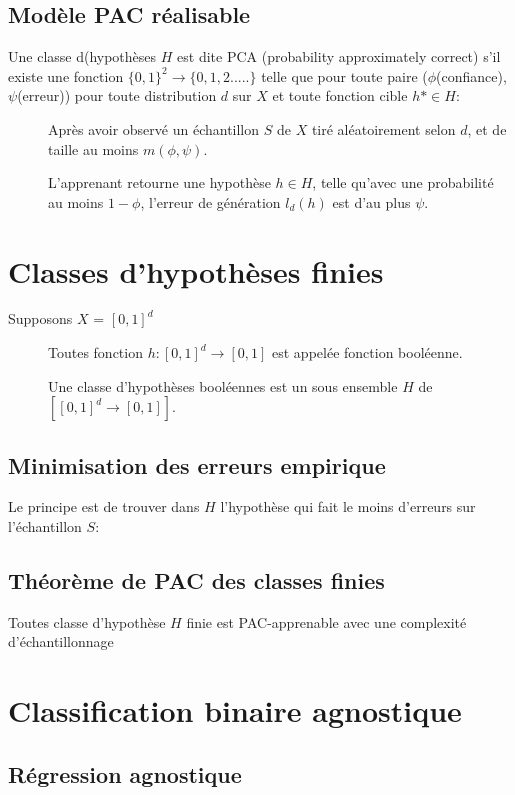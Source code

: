 \subsection{Modèle PAC réalisable}
Une classe d(hypothèses $H$ est dite PCA (probability approximately correct) s'il existe une fonction $\{0,1\}^2 \rightarrow \{0,1,2.....\}$ telle que pour toute paire ($\phi$(confiance),$\psi$(erreur)) pour toute distribution $d$ sur $X$ et toute fonction cible $h* \in H$:
\begin{description}
\item[] Après avoir observé un échantillon $S$ de $X$ tiré aléatoirement selon $d$, et de taille au moins $m(\phi,\psi)$.
\item[] L'apprenant retourne une hypothèse $h \in H$, telle qu'avec une probabilité au moins $1 - \phi$, l'erreur de génération $l_d(h)$ est d'au plus $\psi$.
\end{description}

\section{Classes d'hypothèses finies}

Supposons $X$ = $[0,1]^d$

\begin{description}
\item[] Toutes fonction $h: [0,1]^d \rightarrow [0,1]$ est appelée fonction booléenne.
\item[] Une classe d'hypothèses booléennes est un sous ensemble $H$ de $[[0,1]^d \rightarrow [0,1]]$.
\end{description}

\subsection{Minimisation des erreurs empirique}
Le principe est de trouver dans $H$ l'hypothèse qui fait le moins d'erreurs sur l'échantillon $S$:


\subsection{Théorème de PAC des classes finies}
Toutes classe d'hypothèse $H$ finie est PAC-apprenable avec une complexité d'échantillonnage

\pagebreak
\section{Classification binaire agnostique}
\subsection{Régression agnostique}


\pagebreak

